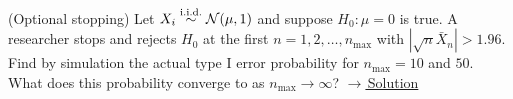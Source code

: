 \documentclass[main.tex]{subfiles}
\begin{document}
\begin{exercise}\label{exr:13-6}
(Optional stopping) Let $X_i\overset{\text{i.i.d.}}{\sim}\mathcal{N}(\mu,1)$ and suppose $H_0:\mu=0$ is true. A researcher stops and rejects $H_0$ at the first $n=1,2,\dots,n_{\max}$ with $|\sqrt n\bar X_n|>1.96$. Find by simulation the actual type I error probability for $n_{\max}=10$ and $50$. What does this probability converge to as $n_{\max}\to\infty$?
\hfill\hyperref[coz:13-6]{\footnotesize$\rightarrow$\,Solution}
\end{exercise}

\end{document}

